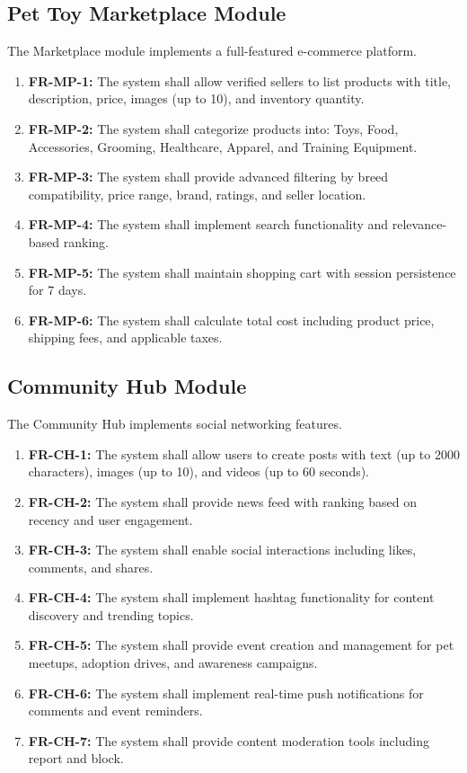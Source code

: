 \subsection{Pet Toy Marketplace Module}
The Marketplace module implements a full-featured e-commerce platform.
\begin{enumerate}
    \item \textbf{FR-MP-1:} The system shall allow verified sellers to list products with title, description, price, images (up to 10), and inventory quantity.
    \item \textbf{FR-MP-2:} The system shall categorize products into: Toys, Food, Accessories, Grooming, Healthcare, Apparel, and Training Equipment.
    \item \textbf{FR-MP-3:} The system shall provide advanced filtering by breed compatibility, price range, brand, ratings, and seller location.
    \item \textbf{FR-MP-4:} The system shall implement search functionality and relevance-based ranking.
    \item \textbf{FR-MP-5:} The system shall maintain shopping cart with session persistence for 7 days.
    \item \textbf{FR-MP-6:} The system shall calculate total cost including product price, shipping fees, and applicable taxes.
\end{enumerate}

\subsection{Community Hub Module}
The Community Hub implements social networking features.
\begin{enumerate}
    \item \textbf{FR-CH-1:} The system shall allow users to create posts with text (up to 2000 characters), images (up to 10), and videos (up to 60 seconds).
    \item \textbf{FR-CH-2:} The system shall provide news feed with ranking based on recency and user engagement.
    \item \textbf{FR-CH-3:} The system shall enable social interactions including likes, comments, and shares.
    \item \textbf{FR-CH-4:} The system shall implement hashtag functionality for content discovery and trending topics.
    \item \textbf{FR-CH-5:} The system shall provide event creation and management for pet meetups, adoption drives, and awareness campaigns.
    \item \textbf{FR-CH-6:} The system shall implement real-time push notifications for comments and event reminders.
    \item \textbf{FR-CH-7:} The system shall provide content moderation tools including report and block.
\end{enumerate}

